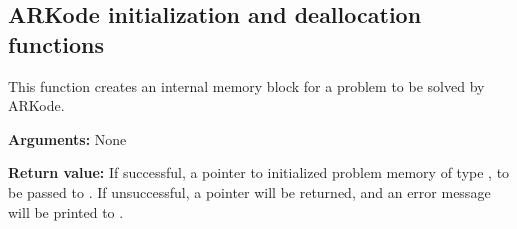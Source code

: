 \documentclass[letterpaper,10pt,english]{sphinxmanual}
\begin{document}
\subsection{ARKode initialization and deallocation functions}
\label{c_interface/User_callable:arkode-initialization-and-deallocation-functions}\label{c_interface/User_callable:cinterface-initialization}

\begin{fulllineitems}
\label{c_interface/User_callable:ARKodeCreate}
This function creates an internal memory block for a problem to be
solved by ARKode.

\textbf{Arguments:}  None

\textbf{Return value:}  If successful, a pointer to initialized problem memory
of type , to be passed to {\hyperref[c_interface/User_callable:ARKodeInit]{}}.
If unsuccessful, a  pointer will be returned, and an error
message will be printed to .

\end{fulllineitems}

\end{document}
